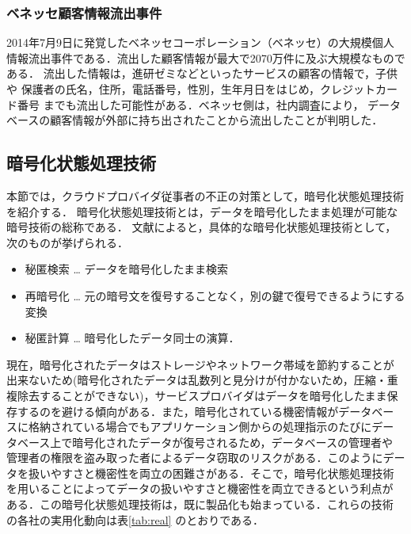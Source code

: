 \subsubsection{ベネッセ顧客情報流出事件}
2014年7月9日に発覚したベネッセコーポレーション（ベネッセ）の大規模個人
情報流出事件である．流出した顧客情報が最大で2070万件に及ぶ大規模なものである．
流出した情報は，進研ゼミなどといったサービスの顧客の情報で，子供や
保護者の氏名，住所，電話番号，性別，生年月日をはじめ，クレジットカード番号
までも流出した可能性がある．ベネッセ側は，社内調査により，
データベースの顧客情報が外部に持ち出されたことから流出したことが判明した．



\subsection{暗号化状態処理技術}
本節では，クラウドプロバイダ従事者の不正の対策として，暗号化状態処理技術を紹介する．
暗号化状態処理技術とは，データを暗号化したまま処理が可能な暗号技術の総称である．
文献\cite{sym}によると，具体的な暗号化状態処理技術として，次のものが挙げられる．

\begin{itemize}
\item 秘匿検索 … データを暗号化したまま検索
\item 再暗号化 … 元の暗号文を復号することなく，別の鍵で復号できるようにする変換
\item 秘匿計算 … 暗号化したデータ同士の演算．
\end{itemize}

現在，暗号化されたデータはストレージやネットワーク帯域を節約することが
出来ないため(暗号化されたデータは乱数列と見分けが付かないため，圧縮・重
複除去することができない)，サービスプロバイダはデータを暗号化したまま保
存するのを避ける傾向がある．また，暗号化されている機密情報がデータベー
スに格納されている場合でもアプリケーション側からの処理指示のたびにデー
タベース上で暗号化されたデータが復号されるため，データベースの管理者や
管理者の権限を盗み取った者によるデータ窃取のリスクがある．このようにデー
タを扱いやすさと機密性を両立の困難さがある．そこで，暗号化状態処理技術
を用いることによってデータの扱いやすさと機密性を両立できるという利点が
ある．この暗号化状態処理技術は，既に製品化も始まっている．これらの技術
の各社の実用化動向は表\ref{tab:real} のとおりである．

